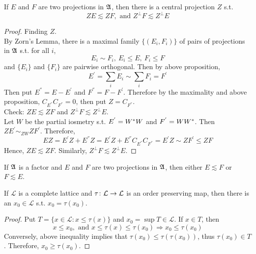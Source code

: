 \begin{thm}
	If $E$ and $F$ are two projections in $\mathfrak{A}$, then there is a central projection $Z$ s.t.
	\begin{equation*}
		ZE \lesssim ZF, \text{ and } Z^{\bot}F \lesssim Z^{\bot}E
	\end{equation*}
\end{thm}
\begin{proof}
	Finding $Z$. \\
	By Zorn's Lemma, there is a maximal family $\{(E_i,F_i)\}$ of pairs of projections in $\mathfrak{A}$ s.t. for all $i$,
	\begin{equation*}
		E_i \sim F_i,~ E_i \leqslant E,~ F_i \leqslant F
	\end{equation*}
	and $\{E_i\}$ and $\{F_i\}$ are pairwise orthogonal. Then by above proposition,
	\begin{equation*}
		E^{'} = \sum_i  E_i \sim \sum_i F_i = F^{'}
	\end{equation*}
	Then put $E^{''} = E - E^{'}$ and $F^{''} = F - F^{'}$. Therefore by the maximality and above proposition, $C_{E^{''}}C_{F^{''}} = 0$, then put $Z = C_{F^{''}}$.\\
	Check: $ZE \lesssim ZF$ and $Z^{\bot}F \lesssim Z^{\bot}E$. \\
	Let $W$ be the partial iosmetry s.t. $E^{'} = W^{*}W$ and $F^{'} = WW^{*}$. Then $ZE^{'} \sim_{ZW} ZF^{'}$. Therefore,
	\begin{equation*}
		EZ = E^{'}Z + E^{''}Z = E^{'}Z + E^{''}C_{E^{''}}C_{F^{''}} = E^{'}Z \sim ZF^{'} \leqslant ZF
	\end{equation*}
	Hence, $ZE \lesssim ZF$. Similarly, $Z^{\bot}F \lesssim Z^{\bot}E$.
\end{proof}

\begin{cor}
	If $\mathfrak{A}$ is a factor and $E$ and $F$ are two projections in $\mathfrak{A}$, then either $E \lesssim F$ or $F \lesssim E$.
\end{cor}

\begin{lem}
	If $\mathcal{L}$ is a complete lattice and $\tau \colon \mathcal{L} \rightarrow \mathcal{L}$  is an order preserving map, then there is an $x_0 \in \mathcal{L}$ s.t. $x_0 = \tau(x_0)$.
\end{lem}
\begin{proof}
	Put $T = \{x \in \mathcal{L} \colon x \leqslant \tau(x)\}$ and $x_0 = \sup{T} \in \mathcal{L}$. If $x \in T$, then
	\begin{equation*}
		x \leqslant x_0, \text{ and } x \leqslant \tau(x) \leqslant \tau(x_0) \Rightarrow x_0 \leqslant \tau(x_0)
	\end{equation*}
	Conversely, above inequality implies that $\tau(x_0) \leqslant \tau(\tau(x_0))$, thus $\tau(x_0) \in T$. Therefore, $x_0 \geqslant \tau(x_0)$.
\end{proof}

